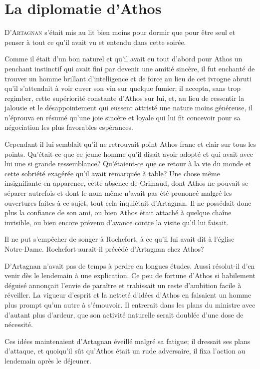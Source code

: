 \chapter{La diplomatie d'Athos}

\lettrine{D}{'Artagnan} s'était mis au lit bien moins pour dormir que pour être seul et penser à tout ce qu'il avait vu et entendu dans cette soirée.

\zz
Comme il était d'un bon naturel et qu'il avait eu tout d'abord pour Athos un penchant instinctif qui avait fini par devenir une amitié sincère, il fut enchanté de trouver un homme brillant d'intelligence et de force au lieu de cet ivrogne abruti qu'il s'attendait à voir cuver son vin sur quelque fumier; il accepta, sans trop regimber, cette supériorité constante d'Athos sur lui, et, au lieu de ressentir la jalousie et le désappointement qui eussent attristé une nature moins généreuse, il n'éprouva en résumé qu'une joie sincère et loyale qui lui fit concevoir pour sa négociation les plus favorables espérances.

Cependant il lui semblait qu'il ne retrouvait point Athos franc et clair sur tous les points. Qu'était-ce que ce jeune homme qu'il disait avoir adopté et qui avait avec lui une si grande ressemblance? Qu'étaient-ce que ce retour à la vie du monde et cette sobriété exagérée qu'il avait remarquée à table? Une chose même insignifiante en apparence, cette absence de Grimaud, dont Athos ne pouvait se séparer autrefois et dont le nom même n'avait pas été prononcé malgré les ouvertures faites à ce sujet, tout cela inquiétait d'Artagnan. Il ne possédait donc plus la confiance de son ami, ou bien Athos était attaché à quelque chaîne invisible, ou bien encore prévenu d'avance contre la visite qu'il lui faisait.

Il ne put s'empêcher de songer à Rochefort, à ce qu'il lui avait dit à l'église Notre-Dame. Rochefort aurait-il précédé d'Artagnan chez Athos?

D'Artagnan n'avait pas de temps à perdre en longues études. Aussi résolut-il d'en venir dès le lendemain à une explication. Ce peu de fortune d'Athos si habilement déguisé annonçait l'envie de paraître et trahissait un reste d'ambition facile à réveiller. La vigueur d'esprit et la netteté d'idées d'Athos en faisaient un homme plus prompt qu'un autre à s'émouvoir. Il entrerait dans les plans du ministre avec d'autant plus d'ardeur, que son activité naturelle serait doublée d'une dose de nécessité.

Ces idées maintenaient d'Artagnan éveillé malgré sa fatigue; il dressait ses plans d'attaque, et quoiqu'il sût qu'Athos était un rude adversaire, il fixa l'action au lendemain après le déjeuner.

